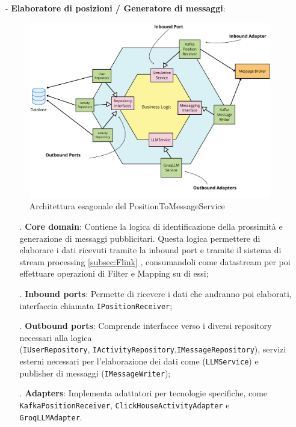 \documentclass[10pt]{article}
\begin{document}
\begin{itemize}
        \item[-] \textbf{Elaboratore di posizioni / Generatore di messaggi}:
        \begin{figure}[H]
        \centering
        \includegraphics[width=\textwidth]{ProcessorService.pdf}
        \caption{Architettura esagonale del PositionToMessageService}
        \end{figure}
        \begin{itemize}
            \item[.] \textbf{Core domain}: Contiene la logica di identificazione della prossimità e generazione di messaggi pubblicitari. Questa logica permettere di elaborare i dati ricevuti tramite la inbound port e tramite il sistema di stream processing \ref{subsec:Flink} , consumandoli come datastream per poi effettuare operazioni di Filter e Mapping su di essi;
            \item[.] \textbf{Inbound ports}: Permette di ricevere i dati che andranno poi elaborati, interfaccia chiamata \texttt{IPositionReceiver};
            \item[.] \textbf{Outbound ports}: Comprende interfacce verso i diversi repository necessari alla logica \\ (\texttt{IUserRepository}, \texttt{IActivityRepository},\texttt{IMessageRepository}), servizi esterni necessari per l'elaborazione dei dati come  (\texttt{LLMService}) e publisher di messaggi (\texttt{IMessageWriter});
            \item[.] \textbf{Adapters}: Implementa adattatori per tecnologie specifiche, come \texttt{KafkaPositionReceiver}, \texttt{ClickHouseActivityAdapter} e \texttt{GroqLLMAdapter}.
        \end{itemize}
    \end{itemize}
\end{document}
